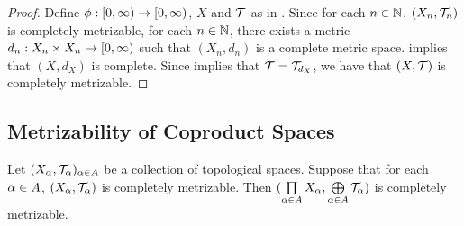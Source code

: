 \documentclass{book}
\begin{document}
\begin{proof}
	Define $\phi: [0,\infty) \rightarrow [0,\infty)$, $X$ and $\mathcal{T}$ as in . Since for each $n \in \mathbb{N}$, $(X_n, \mathcal{T}_n)$ is completely metrizable, for each $n \in \mathbb{N}$, there exists a metric $d_n:X_n \times X_n \rightarrow [0,\infty)$ such that $(X_n, d_n)$ is a complete metric space.  implies that $(X, d_X)$ is complete. Since  implies that $\mathcal{T} = \mathcal{T}_{d_X}$, we have that $(X, \mathcal{T})$ is completely metrizable. 
\end{proof}



























\subsection{Metrizability of Coproduct Spaces}


\begin{ex} 
	Let $(X_{\alpha}, \mathcal{T}_{\alpha})_{\alpha \in A}$ be a collection of topological spaces. Suppose that for each ${\alpha} \in A$, $(X_{\alpha}, \mathcal{T}_{\alpha})$ is completely metrizable. Then $(\prod\limits_{\alpha \in A} X_{\alpha}, \bigoplus\limits_{\alpha \in A} \mathcal{T}_\alpha)$ is completely metrizable.  
\end{ex}
\end{document}
